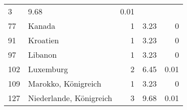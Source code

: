 \begin{longtable}{lXrrr}
       \num{3} &
       \num[round-mode=places,round-precision=2]{9.68} &
         \num[round-mode=places,round-precision=2]{0.01} \\

     77 &
     \multicolumn{1}{X}{ Kanada   } &


       \num{1} &
       \num[round-mode=places,round-precision=2]{3.23} &
         \num[round-mode=places,round-precision=2]{0} \\

     91 &
     \multicolumn{1}{X}{ Kroatien   } &


       \num{1} &
       \num[round-mode=places,round-precision=2]{3.23} &
         \num[round-mode=places,round-precision=2]{0} \\

     97 &
     \multicolumn{1}{X}{ Libanon   } &


       \num{1} &
       \num[round-mode=places,round-precision=2]{3.23} &
         \num[round-mode=places,round-precision=2]{0} \\

     102 &
     \multicolumn{1}{X}{ Luxemburg   } &


       \num{2} &
       \num[round-mode=places,round-precision=2]{6.45} &
         \num[round-mode=places,round-precision=2]{0.01} \\

     109 &
     \multicolumn{1}{X}{ Marokko, Königreich   } &


       \num{1} &
       \num[round-mode=places,round-precision=2]{3.23} &
         \num[round-mode=places,round-precision=2]{0} \\

     127 &
     \multicolumn{1}{X}{ Niederlande, Königreich   } &


       \num{3} &
       \num[round-mode=places,round-precision=2]{9.68} &
         \num[round-mode=places,round-precision=2]{0.01} \\


\end{longtable}
